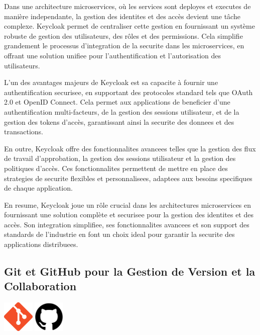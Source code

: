 \documentclass[a4paper, 11pt, openany]{report}
\begin{document}
Dans une architecture microservices, où les services sont deployes et executes de manière independante, la gestion des identites et des accès devient une tâche complexe. Keycloak permet de centraliser cette gestion en fournissant un système robuste de gestion des utilisateurs, des rôles et des permissions. Cela simplifie grandement le processus d'integration de la securite dans les microservices, en offrant une solution unifiee pour l'authentification et l'autorisation des utilisateurs.

L'un des avantages majeurs de Keycloak est sa capacite à fournir une authentification securisee, en supportant des protocoles standard tels que OAuth 2.0 et OpenID Connect. Cela permet aux applications de beneficier d'une authentification multi-facteurs, de la gestion des sessions utilisateur, et de la gestion des tokens d'accès, garantissant ainsi la securite des donnees et des transactions.

En outre, Keycloak offre des fonctionnalites avancees telles que la gestion des flux de travail d'approbation, la gestion des sessions utilisateur et la gestion des politiques d'accès. Ces fonctionnalites permettent de mettre en place des strategies de securite flexibles et personnalisees, adaptees aux besoins specifiques de chaque application.

En resume, Keycloak joue un rôle crucial dans les architectures microservices en fournissant une solution complète et securisee pour la gestion des identites et des accès. Son integration simplifiee, ses fonctionnalites avancees et son support des standards de l'industrie en font un choix ideal pour garantir la securite des applications distribuees.


\subsection{Git et GitHub pour la Gestion de Version et la Collaboration}
\begin{center}
\includegraphics[height=1.5cm]{git.png}
\includegraphics[height=1.5cm]{github.png}
\end{center}
\end{document}
